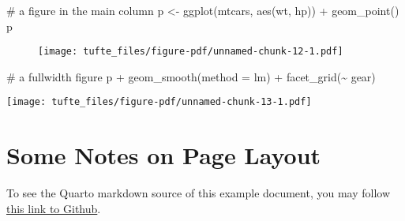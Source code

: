 \documentclass[
  letterpaper,
  DIV=11,
  numbers=noendperiod,
  oneside]{scrartcl}
\newenvironment{Shaded}{\begin{snugshade}}{\end{snugshade}}
\newcommand{\AttributeTok}[1]{\textcolor[rgb]{0.40,0.45,0.13}{#1}}
\newcommand{\CommentTok}[1]{\textcolor[rgb]{0.37,0.37,0.37}{#1}}
\newcommand{\FunctionTok}[1]{\textcolor[rgb]{0.28,0.35,0.67}{#1}}
\newcommand{\NormalTok}[1]{\textcolor[rgb]{0.00,0.23,0.31}{#1}}
\newcommand{\OtherTok}[1]{\textcolor[rgb]{0.00,0.23,0.31}{#1}}
\newcommand{\SpecialCharTok}[1]{\textcolor[rgb]{0.37,0.37,0.37}{#1}}
\newcommand{\StringTok}[1]{\textcolor[rgb]{0.13,0.47,0.30}{#1}}
\begin{document}
\begin{Shaded}
\begin{Highlighting}[]
\CommentTok{\# a figure in the main column}
\NormalTok{p }\OtherTok{\textless{}{-}} \FunctionTok{ggplot}\NormalTok{(mtcars, }\FunctionTok{aes}\NormalTok{(wt, hp)) }\SpecialCharTok{+} \FunctionTok{geom\_point}\NormalTok{()}
\NormalTok{p}
\end{Highlighting}
\end{Shaded}

\begin{figure}[H]

{\centering \texttt{[image: tufte\_files/figure-pdf/unnamed-chunk-12-1.pdf]}

}

\end{figure}

\begin{Shaded}
\begin{Highlighting}[]
\CommentTok{\# a fullwidth figure}
\NormalTok{p }\SpecialCharTok{+} \FunctionTok{geom\_smooth}\NormalTok{(}\AttributeTok{method =} \StringTok{\textquotesingle{}lm\textquotesingle{}}\NormalTok{) }\SpecialCharTok{+} \FunctionTok{facet\_grid}\NormalTok{(}\SpecialCharTok{\textasciitilde{}}\NormalTok{ gear)}
\end{Highlighting}
\end{Shaded}

\begin{figure*}[H]

{\centering \texttt{[image: tufte\_files/figure-pdf/unnamed-chunk-13-1.pdf]}

}

\end{figure*}

\hypertarget{some-notes-on-page-layout}{%
\section{Some Notes on Page Layout}\label{some-notes-on-page-layout}}

To see the Quarto markdown source of this example document, you may
follow
\href{https://raw.githubusercontent.com/quarto-dev/quarto-gallery/main/page-layout/tufte.qmd}{this
link to Github}.
\end{document}
